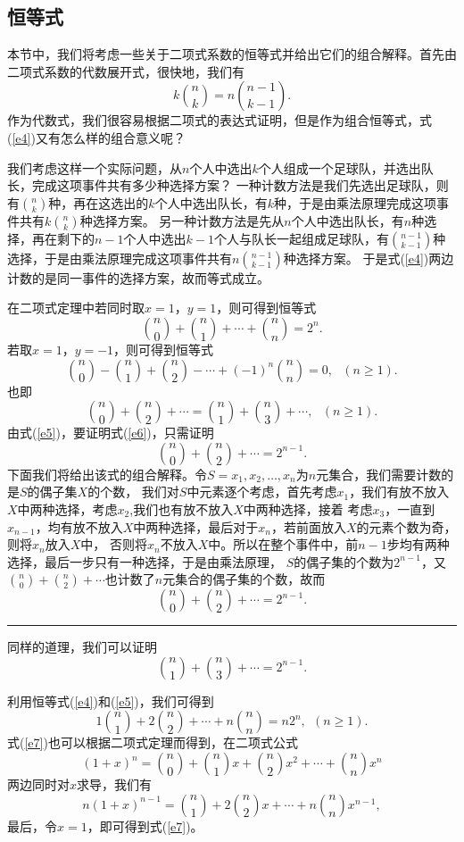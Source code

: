 \documentclass[a4paper,11pt]{article}
\def\qed{\nopagebreak\hfill{\rule{4pt}{7pt}}\medbreak}
\begin{document}
\subsection{恒等式}
本节中，我们将考虑一些关于二项式系数的恒等式并给出它们的组合解释。首先由二项式系数的代数展开式，很快地，我们有
\begin{equation}\label{e4}
k{n\choose k}=n{n-1 \choose k-1}.
\end{equation}
作为代数式，我们很容易根据二项式的表达式证明，但是作为组合恒等式，式(\ref{e4})又有怎么样的组合意义呢？

我们考虑这样一个实际问题，从$n$个人中选出$k$个人组成一个足球队，并选出队长，完成这项事件共有多少种选择方案？
一种计数方法是我们先选出足球队，则有${n\choose
k}$种，再在这选出的$k$个人中选出队长，有$k$种，于是由乘法原理完成这项事件共有$k{n\choose
k}$种选择方案。
另一种计数方法是先从$n$个人中选出队长，有$n$种选择，再在剩下的$n-1$个人中选出$k-1$个人与队长一起组成足球队，有${n-1\choose
k-1}$种选择，于是由乘法原理完成这项事件共有$n{n-1 \choose
k-1}$种选择方案。
于是式(\ref{e4})两边计数的是同一事件的选择方案，故而等式成立。

在二项式定理中若同时取$x=1$，$y=1$，则可得到恒等式
\begin{equation}\label{e5}
{n\choose 0}+{n\choose 1}+\cdots+{n\choose n}=2^n.
\end{equation}
若取$x=1$，$y=-1$，则可得到恒等式
$${n\choose 0}-{n\choose 1}+{n\choose 2}-\cdots+(-1)^n{n\choose n}=0,\ \ \ (n\geq 1).
$$
也即
\begin{equation}\label{e6}
{n\choose 0}+{n\choose 2}+\cdots={n\choose 1}+{n\choose 3}+\cdots,\
\ \ (n\geq 1).
\end{equation}
由式(\ref{e5})，要证明式(\ref{e6})，只需证明
$${n\choose 0}+{n\choose 2}+\cdots=2^{n-1}.$$
下面我们将给出该式的组合解释。令$S={x_1,x_2,\ldots,x_n}$为$n$元集合，我们需要计数的是$S$的偶子集$X$的个数，
我们对$S$中元素逐个考虑，首先考虑$x_1$，我们有放不放入$X$中两种选择，考虑$x_2$,我们也有放不放入$X$中两种选择，接着
考虑$x_3$，一直到$x_{n-1}$，均有放不放入$X$中两种选择，最后对于$x_n$，若前面放入$X$的元素个数为奇，则将$x_n$放入$X$中，
否则将$x_n$不放入$X$中。所以在整个事件中，前$n-1$步均有两种选择，最后一步只有一种选择，于是由乘法原理，
$S$的偶子集的个数为$2^{n-1}$，又${n\choose 0}+{n\choose
2}+\cdots$也计数了$n$元集合的偶子集的个数，故而
$${n\choose 0}+{n\choose 2}+\cdots=2^{n-1}.$$
\qed

同样的道理，我们可以证明$${n\choose 1}+{n\choose
3}+\cdots=2^{n-1}.$$

利用恒等式(\ref{e4})和(\ref{e5})，我们可得到
\begin{equation}\label{e7}
1{n\choose 1}+2{n\choose 2}+\cdots+n{n \choose n}=n2^n,\ \ (n\geq
1).
\end{equation}
式(\ref{e7})也可以根据二项式定理而得到，在二项式公式
$$(1+x)^n={n\choose 0}+{n\choose 1}x+{n\choose 2}x^2+\cdots+{n\choose n}x^n$$
两边同时对$x$求导，我们有
$$n(1+x)^{n-1}={n\choose 1}+2{n\choose 2}x+\cdots+n{n\choose n}x^{n-1},$$
最后，令$x=1$，即可得到式(\ref{e7})。
\end{document}
